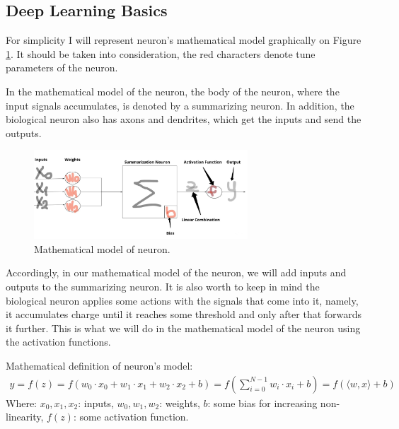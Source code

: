 \subsection{Deep Learning Basics}
For simplicity I will represent neuron's mathematical model graphically on Figure \ref{fig:neuron}. It should be taken into consideration, the red characters denote tune parameters of the neuron.     

In the mathematical model of the neuron, the body of the neuron, where the input signals accumulates, is denoted by a summarizing neuron. In addition, the biological neuron also has axons and dendrites, which get the inputs and send the outputs. 

\begin{figure}[h]
    \centering \includegraphics[width=8cm]{images/neuron_math_model.jpg}
    \caption {Mathematical model of neuron.}
    \label{fig:neuron}
\end{figure} 

Accordingly, in our mathematical model of the neuron, we will add inputs and outputs to the summarizing neuron. It is also worth to keep in mind the biological neuron applies some actions with the signals that come into it, namely, it accumulates charge until it reaches some threshold and only after that forwards it further. This is what we will do in the mathematical model of the neuron using the activation functions.

Mathematical definition of neuron's model:
\begin{align*}
y = f(z) = f(w_0 \cdot x_0+w_1 \cdot x_1+w_2 \cdot x_2+b) = f(\sum\limits_{i=0}^{N-1} w_i \cdot x_i+b) = f(\langle w, x \rangle + b)
\end{align*}
Where: $x_0, x_1, x_2$: inputs, $w_0, w_1, w_2$: weights,  $b$: some bias for increasing non-linearity, $f(z)$: some activation function. 

